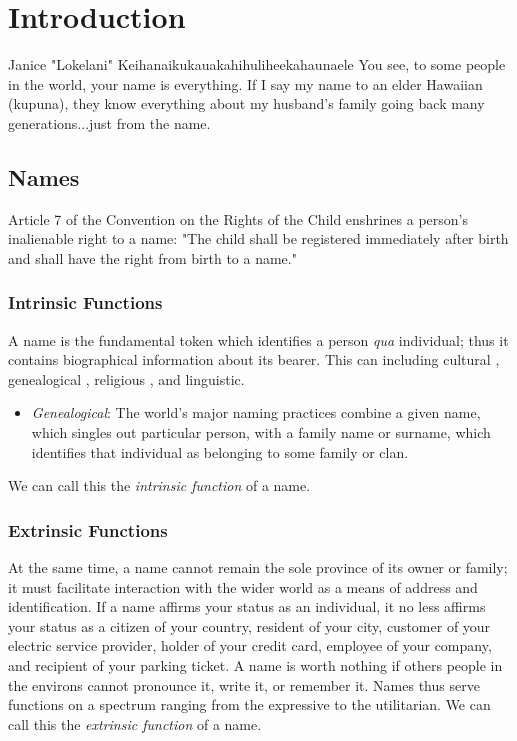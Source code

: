 \section{Introduction}

\begin{aquote}{Janice "Lokelani" Keihanaikukauakahihuliheekahaunaele}
You see, to some people in the world, your name is everything. If I say my name
to an elder Hawaiian (kupuna), they know everything about my husband's family
going back many generations...just from the name.
\end{aquote}

\subsection{Names}

Article 7 of the Convention on the Rights of the Child enshrines a person's
inalienable right to a name: "The child shall be registered immediately after
birth and shall have the right from birth to a name." \parencite{crc}

\subsubsection{Intrinsic Functions}

A name is the fundamental token which identifies a person \textit{qua}
individual; thus it contains biographical information about its bearer. This
can including cultural , genealogical , religious , and linguistic. 

\begin{itemize}
\item \textit{Genealogical}: The world's major naming practices combine a
given name, which singles out particular person, with a family name or surname,
which identifies that individual as belonging to some family or clan.
\end{itemize}

We can call
this the \textit{intrinsic function} of a name.

\subsubsection{Extrinsic Functions}

At the same time, a name cannot remain the sole province of its owner or family;
it must facilitate interaction with the wider world as a means of address and
identification. If a name affirms your status as an individual, it no less
affirms your status as a citizen of your country, resident of your city,
customer of your electric service provider, holder of your credit card, employee
of your company, and recipient of your parking ticket. A name is worth nothing
if others people in the environs cannot pronounce it, write it, or remember it.
Names thus serve functions on a spectrum ranging from the expressive to the
utilitarian. We can call this the \textit{extrinsic function} of a name.

